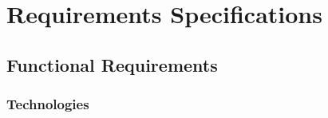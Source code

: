 \chapter{Requirements Specifications}
\label{ch:RequirementsSpecifications}
\section{Functional Requirements}
\subsection{Technologies}
